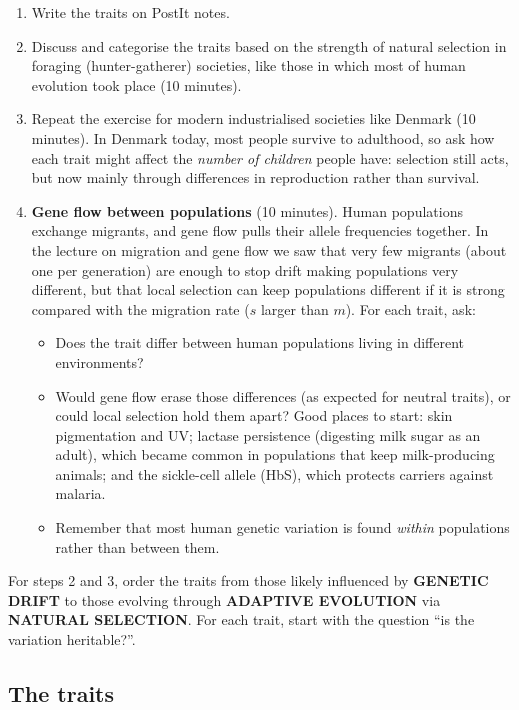 \documentclass[
  a4paper]{book}
\providecommand{\tightlist}{%
  \setlength{\itemsep}{0pt}\setlength{\parskip}{0pt}}
\begin{document}
\begin{enumerate}
\def\labelenumi{\arabic{enumi}.}
\tightlist
\item
  Write the traits on PostIt notes.
\item
  Discuss and categorise the traits based on the strength of natural selection in foraging (hunter-gatherer) societies, like those in which most of human evolution took place (10 minutes).
\item
  Repeat the exercise for modern industrialised societies like Denmark (10 minutes). In Denmark today, most people survive to adulthood, so ask how each trait might affect the \emph{number of children} people have: selection still acts, but now mainly through differences in reproduction rather than survival.
\item
  \textbf{Gene flow between populations} (10 minutes). Human populations exchange migrants, and gene flow pulls their allele frequencies together. In the lecture on migration and gene flow we saw that very few migrants (about one per generation) are enough to stop drift making populations very different, but that local selection can keep populations different if it is strong compared with the migration rate (\(s\) larger than \(m\)). For each trait, ask:

  \begin{itemize}
  \tightlist
  \item
    Does the trait differ between human populations living in different environments?
  \item
    Would gene flow erase those differences (as expected for neutral traits), or could local selection hold them apart? Good places to start: skin pigmentation and UV; lactase persistence (digesting milk sugar as an adult), which became common in populations that keep milk-producing animals; and the sickle-cell allele (HbS), which protects carriers against malaria.
  \item
    Remember that most human genetic variation is found \emph{within} populations rather than between them.
  \end{itemize}
\end{enumerate}

For steps 2 and 3, order the traits from those likely influenced by \textbf{GENETIC DRIFT} to those evolving through \textbf{ADAPTIVE EVOLUTION} via \textbf{NATURAL SELECTION}. For each trait, start with the question ``is the variation heritable?''.

\subsection{The traits}\label{the-traits}
\end{document}
